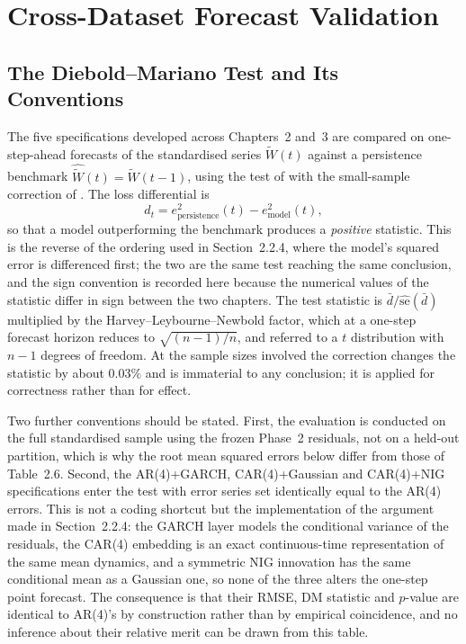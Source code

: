 \documentclass[11pt, a4paper, twoside]{article}
\begin{document}
\section{Cross-Dataset Forecast Validation}
\label{sec:validation}

\subsection{The Diebold--Mariano Test and Its Conventions}
\label{sec:dm}

The five specifications developed across Chapters~2 and~3 are compared on one-step-ahead forecasts of the standardised series $\widetilde W(t)$ against a persistence benchmark $\hat{\widetilde W}(t) = \widetilde W(t-1)$, using the test of \citet{DieboldMariano1995} with the small-sample correction of \citet{HarveyEtAl1997}. The loss differential is
\begin{equation}
d_t = e^2_{\text{persistence}}(t) - e^2_{\text{model}}(t),
\end{equation}
so that a model outperforming the benchmark produces a \emph{positive} statistic. This is the reverse of the ordering used in Section~2.2.4, where the model's squared error is differenced first; the two are the same test reaching the same conclusion, and the sign convention is recorded here because the numerical values of the statistic differ in sign between the two chapters. The test statistic is $\bar d / \widehat{\mathrm{se}}(\bar d)$ multiplied by the Harvey--Leybourne--Newbold factor, which at a one-step forecast horizon reduces to $\sqrt{(n-1)/n}$, and referred to a $t$ distribution with $n-1$ degrees of freedom. At the sample sizes involved the correction changes the statistic by about $0.03\%$ and is immaterial to any conclusion; it is applied for correctness rather than for effect.

Two further conventions should be stated. First, the evaluation is conducted on the full standardised sample using the frozen Phase~2 residuals, not on a held-out partition, which is why the root mean squared errors below differ from those of Table~2.6. Second, the AR(4)+GARCH, CAR(4)+Gaussian and CAR(4)+NIG specifications enter the test with error series set identically equal to the AR(4) errors. This is not a coding shortcut but the implementation of the argument made in Section~2.2.4: the GARCH layer models the conditional variance of the residuals, the CAR(4) embedding is an exact continuous-time representation of the same mean dynamics, and a symmetric NIG innovation has the same conditional mean as a Gaussian one, so none of the three alters the one-step point forecast. The consequence is that their RMSE, DM statistic and $p$-value are identical to AR(4)'s by construction rather than by empirical coincidence, and no inference about their relative merit can be drawn from this table.
\end{document}
